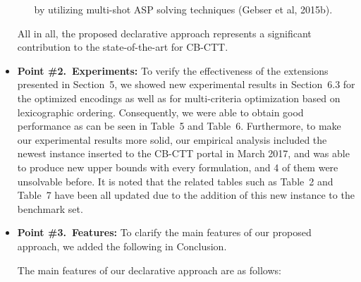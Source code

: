 \documentclass[a4j]{article}
\begin{document}
\begin{itemize}
\begin{it}
\begin{enumerate}
  by utilizing multi-shot ASP solving techniques (Gebser et al, 2015b).
\end{enumerate}
All in all, the proposed declarative approach represents a significant
contribution to the state-of-the-art for CB-CTT.
\end{it}
\item \textbf{Point \#2.~Experiments:}
To verify the effectiveness of the extensions presented in Section~5, 
we showed new experimental results in Section~6.3 for 
the optimized encodings as well as for 
multi-criteria optimization based on lexicographic ordering.
Consequently, 
we were able to obtain good performance as can be seen in 
Table~5 and Table~6.
%
Furthermore, to make our experimental results more solid, 
our empirical analysis included 
the newest  instance 
inserted to the CB-CTT portal in March 2017, and 
{\asap} was able to produce new upper bounds with every formulation,
and 4 of them were unsolvable before.
%
It is noted that the related tables such as 
Table~2 and Table~7 have been all updated
due to the addition of this new instance to the
benchmark set.

\item \textbf{Point \#3.~Features:}
To clarify the main features of our proposed approach,
we added the following in Conclusion.\\[1em]
\begin{it}
The main features of our declarative approach are as follows:
\end{it}
\end{itemize}
\end{document}
